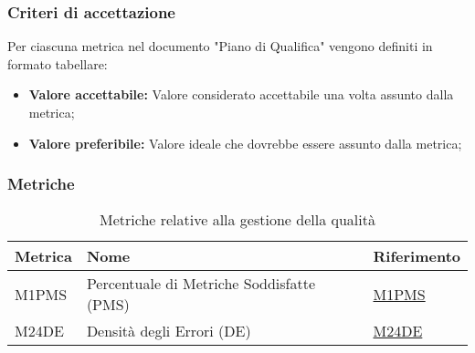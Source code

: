 \subsubsection{Criteri di accettazione}
Per ciascuna metrica nel documento "Piano di Qualifica" vengono definiti in formato tabellare:
\begin{itemize}
    \item \textbf{Valore accettabile:}
        Valore considerato accettabile una volta assunto dalla metrica;
    \item \textbf{Valore preferibile:}
        Valore ideale che dovrebbe essere assunto dalla metrica;
\end{itemize}

\subsubsection{Metriche}
\begin{table}[H]
    \centering
    \begin{tabular}{|C{3cm}|C{3cm}|C{4cm}|}
    \hline
    Metrica & Nome & Riferimento \\
    \hline \hline
    M1PMS & Percentuale di Metriche Soddisfatte (PMS) &  \hyperlink{item:M1PMS}{\textcolor{linkcolor}{M1PMS}} \\
    M24DE & Densità degli Errori (DE) &  \hyperlink{item:M24DE}{\textcolor{linkcolor}{M24DE}} \\
    \hline
    \end{tabular}
    \caption{Metriche relative alla gestione della qualità}
\end{table}

